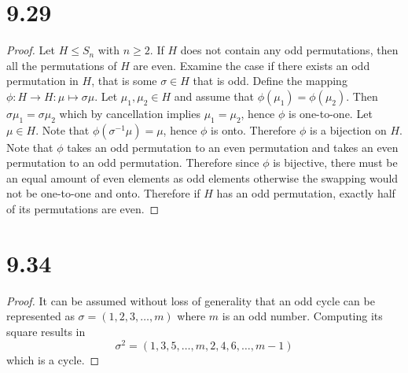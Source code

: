 \documentclass[12pt]{extarticle}
\begin{document}
\section*{9.29}
\begin{proof}
	Let $H \leq S_n$ with $n \geq 2$. If $H$ does not contain any odd permutations, then all the permutations of $H$ are even. Examine the case if there exists an odd permutation in $H$, that is some $\sigma \in H$ that is odd. Define the mapping $\phi : H \to H : \mu \mapsto \sigma\mu$. Let $\mu_1, \mu_2 \in H$ and assume that $\phi(\mu_1) = \phi(\mu_2)$. Then $\sigma \mu_1 = \sigma \mu_2$ which by cancellation implies $\mu_1 = \mu_2$, hence $\phi$ is one-to-one. Let $\mu \in H$. Note that $\phi(\sigma^{-1} \mu) = \mu$, hence $\phi$ is onto. Therefore $\phi$ is a bijection on $H$. Note that $\phi$ takes an odd permutation to an even permutation and takes an even permutation to an odd permutation. Therefore since $\phi$ is bijective, there must be an equal amount of even elements as odd elements otherwise the swapping would not be one-to-one and onto. Therefore if $H$ has an odd permutation, exactly half of its permutations are even.
\end{proof}

\section*{9.34}
\begin{proof}
	It can be assumed without loss of generality that an odd cycle can be represented as $\sigma = (1,2,3,\ldots,m)$ where $m$ is an odd number. Computing its square results in
	\[
		\sigma^2 = (1,3,5,\ldots,m,2,4,6,\ldots,m-1)
	\]
	which is a cycle.
\end{proof}
\end{document}
